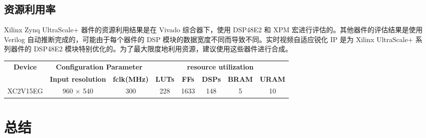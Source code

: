 \documentclass[12pt, a4paper, oneside]{ctexbook}
\begin{document}
	\section{资源利用率}	
	Xilinx Zynq UltraScale+ 器件的资源利用结果是在 Vivado 综合器下，使用 DSP48E2 和 XPM 宏进行评估的。其他器件的评估结果是使用 Verilog 自动推断完成的，可能由于每个器件的 DSP 模块的数据宽度不同而导致不同。实时视频自适应锐化 IP 是为 Xilinx UltraScale+ 系列器件的 DSP48E2 模块特别优化的。为了最大限度地利用资源，建议使用这些器件进行合成。
	\begin{table}[h]
		\centering
		\begin{tabular}{|c|cc|ccccc|}
			\hline
			\multirow{2}{*}{\textbf{Device}} & \multicolumn{2}{c|}{\textbf{Configuration Parameter}}               & \multicolumn{5}{c|}{\textbf{resource utilization}}                                                                                                               \\ \cline{2-8} 
			& \multicolumn{1}{c|}{\textbf{Input resolution}} & \textbf{fclk(MHz)} & \multicolumn{1}{c|}{\textbf{LUTs}} & \multicolumn{1}{c|}{\textbf{FFs}} & \multicolumn{1}{c|}{\textbf{DSPs}} & \multicolumn{1}{c|}{\textbf{BRAM}} & \textbf{URAM} \\ \hline
			XC2V15EG                         & \multicolumn{1}{c|}{960 × 540}                 & 300                & \multicolumn{1}{c|}{228}           & \multicolumn{1}{c|}{1633}         & \multicolumn{1}{c|}{148}           & \multicolumn{1}{c|}{5}             & 10            \\ \hline
		\end{tabular}
	\end{table}
	
	\chapter{总结}
\end{document}
